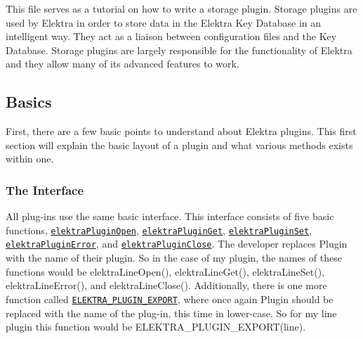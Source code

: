 This file serves as a tutorial on how to write a storage plugin. Storage plugins are used by Elektra in order to store data in the Elektra Key Database in an intelligent way. They act as a liaison between configuration files and the Key Database. Storage plugins are largely responsible for the functionality of Elektra and they allow many of its advanced features to work.

\subsection*{Basics}

First, there are a few basic points to understand about Elektra plugins. This first section will explain the basic layout of a plugin and what various methods exists within one.

\subsubsection*{The Interface}

All plug-\/ins use the same basic interface. This interface consists of five basic functions, \href{http://doc.libelektra.org/api/current/html/group__plugin.html#ga1a72ac76b618943677e00ed7ab50b372}{\tt elektra\+Plugin\+Open}, \href{http://doc.libelektra.org/api/current/html/group__plugin.html#ga2f14a12b205687a31e6fd0645470ec69}{\tt elektra\+Plugin\+Get}, \href{http://doc.libelektra.org/api/current/html/group__plugin.html#ga01dd4018e48c3a091cb03940a7a8341f}{\tt elektra\+Plugin\+Set}, \href{http://doc.libelektra.org/api/current/html/group__plugin.html#gab0f8a88ee9868fb698b4e3040a70e000}{\tt elektra\+Plugin\+Error}, and \href{http://doc.libelektra.org/api/current/html/group__plugin.html#gaed8aeda2b2beab1b8052f8a64c601754}{\tt elektra\+Plugin\+Close}. The developer replaces {\ttfamily Plugin} with the name of their plugin. So in the case of my plugin, the names of these functions would be {\ttfamily elektra\+Line\+Open()}, {\ttfamily elektra\+Line\+Get()}, {\ttfamily elektra\+Line\+Set()}, {\ttfamily elektra\+Line\+Error()}, and {\ttfamily elektra\+Line\+Close()}. Additionally, there is one more function called \href{http://doc.libelektra.org/api/current/html/group__plugin.html#gabe78724d2d477eef39997fd9b85bff16}{\tt E\+L\+E\+K\+T\+R\+A\+\_\+\+P\+L\+U\+G\+I\+N\+\_\+\+E\+X\+P\+O\+R\+T}, where once again {\ttfamily Plugin} should be replaced with the name of the plug-\/in, this time in lower-\/case. So for my line plugin this function would be {\ttfamily E\+L\+E\+K\+T\+R\+A\+\_\+\+P\+L\+U\+G\+I\+N\+\_\+\+E\+X\+P\+O\+R\+T(line)}.

